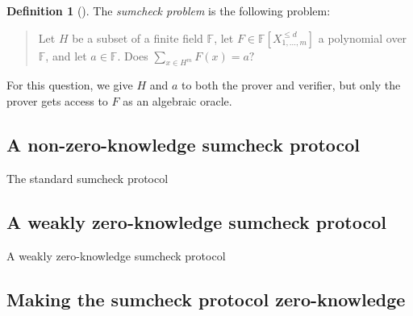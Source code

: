 \documentclass[english]{reedthesis}
\theoremstyle{plain}
\theoremstyle{definition}
\newtheorem{defn}[defn]{Definition}
\theoremstyle{remark}
\begin{document}
\begin{defn}[{\cite{LFKN92}}]\label{def:sumcheck}
  The \emph{sumcheck problem} is the following problem:
  \begin{quote}
    Let $H$ be a subset of a finite field $\mathbb{F}$, let
    $F \in \mathbb{F}[X_{1, \ldots, m}^{\le d}]$ a polynomial over $\mathbb{F}$, and let
    $a \in \mathbb{F}$. Does $\sum_{x \in H^{m}}F(x) = a?$
  \end{quote}
  For this question, we give $H$ and $a$ to both the prover and verifier, but
  only the prover gets access to $F$ as an algebraic oracle.
\end{defn}

\subsection{A non-zero-knowledge sumcheck protocol}

\begin{algorithm}[H]
  \caption{The standard sumcheck protocol~\cite{LFKN92}}\label{alg:sumcheck-std}
\end{algorithm}

\subsection{A weakly zero-knowledge sumcheck protocol}

\begin{algorithm}[H]
  \caption{A weakly zero-knowledge sumcheck protocol~\cite{BCFGRS17}}\label{alg:sumcheck-std}
\end{algorithm}

\subsection{Making the sumcheck protocol zero-knowledge}
\end{document}
